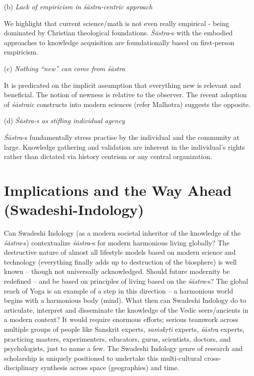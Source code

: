 (b) \textit{Lack of empiricism in śāstra-centric approach}

We highlight that current science/math is not even really empirical - being dominated by Christian theological foundations. \textit{Śāstra}-s with the embodied approaches to knowledge acquisition are foundationally based on first-person empiricism.

(c) \textit{Nothing “new” can come from śāstra}

It is predicated on the implicit assumption that everything new is relevant and beneficial. The notion of newness is relative to the observer. The recent adoption of \textit{śāstraic} constructs into modern sciences (refer Malhotra) suggests the opposite.

(d) \textit{Śāstra-s as stifling individual agency}

\textit{Śāstra}-s fundamentally stress practise by the individual and the community at large. Knowledge gathering and validation are inherent in the individual's rights rather than dictated via history centrism or any central organization.


\section*{Implications and the Way Ahead (Swadeshi-Indology)}

Can Swadeshi Indology (as a modern societal inheritor of the knowledge of the \textit{śāstra}-s) contextualize \textit{śāstra}-s for modern harmonious living globally? The destructive nature of almost all lifestyle models based on modern science and technology (everything finally adds up to destruction of the biosphere) is well known – though not universally acknowledged. Should future modernity be redefined – and be based on principles of living based on the \textit{śāstra}-s? The global reach of Yoga is an example of a step in this direction – a harmonious world begins with a harmonious body (mind). What then can Swadeshi Indology do to articulate, interpret and disseminate the knowledge of the Vedic seers/ancients in a modern context? It would require enormous efforts; serious teamwork across multiple groups of people like Sanskrit experts, \textit{saṁskṛti} experts, \textit{śāstra} experts, practicing masters, experimenters, educators, gurus, scientists, doctors, and psychologists, just to name a few. The Swadeshi Indology genre of research and scholarship is uniquely positioned to undertake this multi-cultural cross-disciplinary synthesis across space (geographies) and time.

